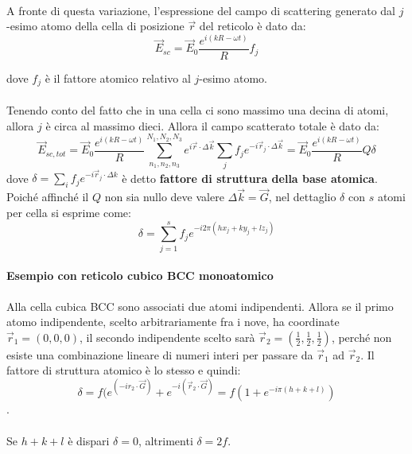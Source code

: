 \documentclass{book}
\begin{document}
        \paragraph{}
            A fronte di questa variazione, l'espressione del campo di scattering generato dal $j$-esimo atomo della cella di posizione $\vec{r}$ del reticolo è dato da:
            $$\vec{E}_{sc} = \vec{E}_{0}\frac{e^{i(kR-\omega t)}}{R}f_{j}$$

         dove $f_{j}$ è il fattore atomico relativo al $j$-esimo atomo.

        \paragraph{}
            Tenendo conto del fatto che in una cella ci sono massimo una decina di atomi, allora $j$ è circa al massimo dieci. Allora il campo scatterato totale è dato da:
            $$\vec{E}_{sc, tot} = \vec{E}_{0} \frac{e^{i(kR - \omega t)}}{R} \sum_{n_{1},n_{2},n_{3}} ^{N_{1},N_{2},N_{3}} e^{i \vec{r} \cdot \Delta \vec{k}} \sum_{j} f_{j} e^{-i \vec{r}_{j} \cdot \Delta \vec{k}} = \vec{E}_{0}\frac{e^{i(kR-\omega t)}}{R} Q \delta$$
            dove $\delta = \sum_{i} f_{j}e^{-i\vec{r}_{j}\cdot \Delta k}$ è detto \textbf{fattore di struttura della base atomica}. Poiché affinché il $Q$ non sia nullo deve valere $\Delta \vec{k} = \vec{G}$, nel dettaglio $\delta$ con $s$ atomi per cella si esprime come:
            $$\delta = \sum_{j=1} ^{s} f_{j}e^{-i2\pi(hx_{j}+ky_{j}+lz_{j})}$$

        \paragraph{Esempio con reticolo cubico BCC monoatomico}
            Alla cella cubica BCC sono associati due atomi indipendenti. Allora se il primo atomo indipendente, scelto arbitrariamente fra i nove, ha coordinate $\vec{r}_{1}=(0,0,0)$, il secondo indipendente scelto sarà $\vec{r}_{2} = (\frac{1}{2}, \frac{1}{2}, \frac{1}{2})$, perché non esiste una combinazione lineare di numeri interi per passare da $\vec{r}_{1}$ ad $\vec{r}_{2}$. Il fattore di struttura atomico è lo stesso e quindi:
            $$\delta = f(e^{(-i r_{2} \cdot \vec{G})}+e^{-i(\vec{r}_{2} \cdot \vec{G})} = f(1+e^{-i\pi(h+k+l)})$$.
        \paragraph{}
            Se $h+k+l$ è dispari $\delta = 0$, altrimenti $\delta = 2f$.
\end{document}
